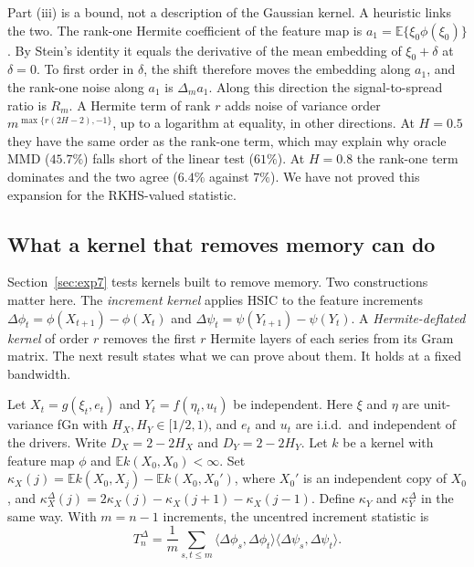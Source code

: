 \documentclass[11pt]{article}
\theoremstyle{remark}
\newcommand{\E}{\mathbb E}
\begin{document}
Part (iii) is a bound, not a description of the Gaussian kernel. A heuristic links the two. The rank-one Hermite coefficient of the feature map is $a_1=\E\{\xi_0\phi(\xi_0)\}$. By Stein's identity it equals the derivative of the mean embedding of $\xi_0+\delta$ at $\delta=0$. To first order in $\delta$, the shift therefore moves the embedding along $a_1$, and the rank-one noise along $a_1$ is $\Delta_m a_1$. Along this direction the signal-to-spread ratio is $R_m$. A Hermite term of rank $r$ adds noise of variance order $m^{\max\{r(2H-2),-1\}}$, up to a logarithm at equality, in other directions. At $H=0.5$ they have the same order as the rank-one term, which may explain why oracle MMD ($45.7\%$) falls short of the linear test ($61\%$). At $H=0.8$ the rank-one term dominates and the two agree ($6.4\%$ against $7\%$). We have not proved this expansion for the RKHS-valued statistic.

\subsection{What a kernel that removes memory can do}\label{sec:memtheory}
Section~\ref{sec:exp7} tests kernels built to remove memory. Two constructions matter here. The \emph{increment kernel} applies HSIC to the feature increments $\Delta\phi_t=\phi(X_{t+1})-\phi(X_t)$ and $\Delta\psi_t=\psi(Y_{t+1})-\psi(Y_t)$. A \emph{Hermite-deflated kernel} of order $r$ removes the first $r$ Hermite layers of each series from its Gram matrix. The next result states what we can prove about them. It holds at a fixed bandwidth.

Let $X_t=g(\xi_t,e_t)$ and $Y_t=f(\eta_t,u_t)$ be independent. Here $\xi$ and $\eta$ are unit-variance fGn with $H_X,H_Y\in[1/2,1)$, and $e_t$ and $u_t$ are i.i.d.\ and independent of the drivers. Write $D_X=2-2H_X$ and $D_Y=2-2H_Y$. Let $k$ be a kernel with feature map $\phi$ and $\E k(X_0,X_0)<\infty$. Set $\kappa_X(j)=\E k(X_0,X_j)-\E k(X_0,X_0')$, where $X_0'$ is an independent copy of $X_0$, and $\kappa^\Delta_X(j)=2\kappa_X(j)-\kappa_X(j+1)-\kappa_X(j-1)$. Define $\kappa_Y$ and $\kappa^\Delta_Y$ in the same way. With $m=n-1$ increments, the uncentred increment statistic is
\begin{equation}\label{eq:incstat}
T_n^\Delta=\frac1m\sum_{s,t\le m}\langle\Delta\phi_s,\Delta\phi_t\rangle\langle\Delta\psi_s,\Delta\psi_t\rangle .
\end{equation}
\end{document}
